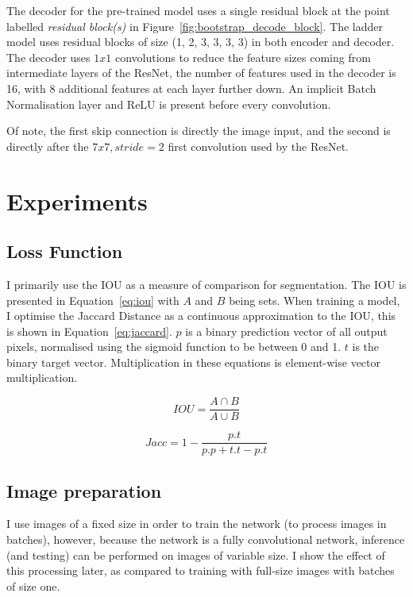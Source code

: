 The decoder for the pre-trained model uses a single residual block at the point labelled \emph{residual block(s)} in Figure~\ref{fig:bootstrap_decode_block}. The ladder model uses residual blocks of size (1, 2, 3, 3, 3, 3) in both encoder and decoder. The decoder uses $ 1x1 $ convolutions to reduce the feature sizes coming from intermediate layers of the ResNet, the number of features used in the decoder is 16, with 8 additional features at each layer further down. An implicit Batch Normalisation layer and ReLU is present before every convolution.

Of note, the first skip connection is directly the image input, and the second is directly after the $7x7, stride=2$ first convolution used by the ResNet.


\section {Experiments}


\subsection {Loss Function}


I primarily use the \gls{IOU} as a measure of comparison for segmentation. The \gls{IOU} is presented in Equation~\ref{eq:iou} with $ A $ and $ B $ being sets. When training a model, I optimise the Jaccard Distance as a continuous approximation to the \gls{IOU}, this is shown in Equation~\ref{eq:jaccard}.  $ p $ is a binary prediction vector of all output pixels, normalised using the sigmoid function to be between 0 and 1. $ t $ is the binary target vector. Multiplication in these equations is element-wise vector multiplication.


\begin{equation}
IOU = \frac{A \cap B}{A \cup B}
\label{eq:iou}
\end{equation}


\begin{equation}
Jacc = 1 - \frac{p.t}{p.p + t.t - p.t}
\label{eq:jaccard}
\end{equation}



\subsection {Image preparation}

I use images of a fixed size in order to train the network (to process images in batches), however, because the network is a fully convolutional network, inference (and testing) can be performed on images of variable size. I show the effect of this processing later, as compared to training with full-size images with batches of size one.

